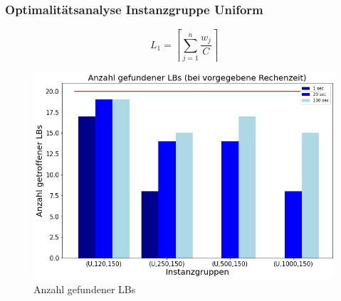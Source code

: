 \documentclass{beamer}
\begin{document}
\begin{frame}

\frametitle{Optimalitätsanalyse Instanzgruppe Uniform}
\begin{footnotesize}
\begin{equation}
L_1 = \left\lceil\sum_{j=1}^{n} \frac{w_j}{C}\right\rceil
\end{equation}
\end{footnotesize}


\begin{figure}[!htbp]
\begin{center}
\includegraphics[scale=0.3]{img/lb_unif.png}
\end{center}
\caption{Anzahl gefundener LBs}
\label{fig:LBs}
\end{figure}



\end{frame}
\end{document}
